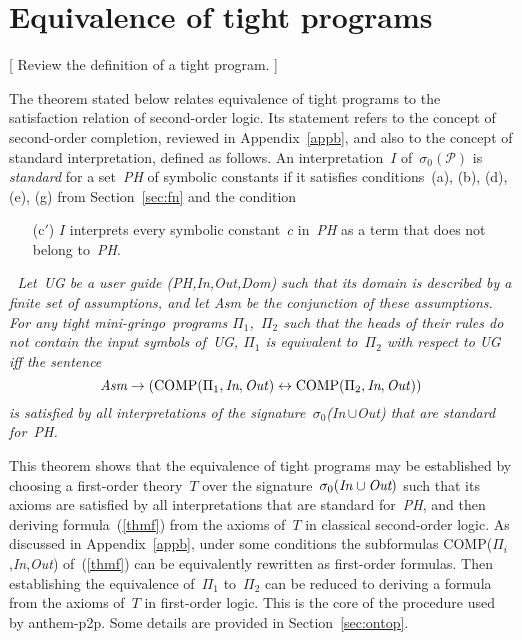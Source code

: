 \documentclass{article}
\def\lrar{\leftrightarrow}
\def\beq{\begin{equation}}
\def\eeq#1{\label{#1}\end{equation}}
\def\gringo{{\sc gringo}}
\newcommand{\PP}{\mathcal{P}}
\begin{document}
\section{Equivalence of tight programs}\label{sec:tight}

[ Review the definition of a tight program. ]
\bigskip

The theorem stated below relates equivalence of tight programs to the
satisfaction relation of second-order logic.  Its statement refers to
the concept of second-order completion, reviewed in Appendix~\ref{appb},
and also to the concept of  standard interpretation, defined as follows.
An interpretation~$I$ of~$\sigma_0(\PP)$ is \emph{standard} for a
set~\emph{PH} of symbolic constants if it
satisfies conditions~(a), (b), (d), (e), (g)
from Section~\ref{sec:fn} and the condition
\begin{itemize}
\item[(c$'$)] $I$ interprets every symbolic constant~$c$ in~\emph{PH}
  as a term that does not belong to~\emph{PH}.
\end{itemize}

\medskip{}$\;$\emph{
  Let~UG be a user guide (PH,In,Out,Dom) such that its domain is described by
  a finite set of assumptions, and let Asm be the conjunction of these
  assumptions.
  For any tight mini-\gringo\ programs $\Pi_1$,~$\Pi_2$ such that the
  heads of their rules do not contain the input symbols of~UG,
$\Pi_1$ is equivalent to~$\Pi_2$ with respect to UG iff the sentence}
\beq
\emph{Asm}\to(\hbox{COMP}(\Pi_1,\emph{In},\emph{Out\/}) \lrar
\hbox{COMP}(\Pi_2,\emph{In},\emph{Out\/}))
\eeq{thmf}
\emph{is satisfied by all interpretations of the
  signature~$\sigma_0$(In\,$\cup$Out) that are standard for~PH.}
\medskip

This theorem shows that the equivalence of tight programs may be established
by choosing a first-order theory~$T$ over the
signature~$\sigma_0(\emph{In\/}\cup\emph{Out})$ such that its axioms are
satisfied by all interpretations that are
standard for~\emph{PH}, and then deriving
formula~(\ref{thmf}) from the axioms of~$T$ in classical second-order logic.
As discussed in Appendix~\ref{appb}, under some conditions the
subformulas COMP($\Pi_i$,\emph{In\/},\emph{Out\/}) of~(\ref{thmf}) can be
equivalently rewritten as first-order formulas.  Then
establishing the equivalence of~$\Pi_1$ to~$\Pi_2$ can be reduced to
deriving a formula from the axioms of~$T$ in first-order logic.
This is the core of the procedure used by {\sc anthem-p2p}.  Some
details are provided in Section~\ref{sec:ontop}.
\end{document}
